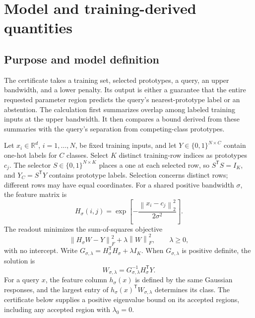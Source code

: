 \documentclass[preprint,12pt]{elsarticle}
\newcommand{\R}{\mathbb{R}}
\newcommand{\norm}[1]{\left\lVert#1\right\rVert}
\newcommand{\tr}{\mathsf{T}}
\begin{document}
\section{Model and training-derived quantities}
\subsection{Purpose and model definition}
The certificate takes a training set, selected prototypes, a query, an upper bandwidth, and a lower penalty. Its output is either a guarantee that the entire requested parameter region predicts the query's nearest-prototype label or an abstention. The calculation first summarizes overlap among labeled training inputs at the upper bandwidth. It then compares a bound derived from these summaries with the query's separation from competing-class prototypes.

Let $x_i\in\R^d$, $i=1,\ldots,N$, be fixed training inputs, and let $Y\in\{0,1\}^{N\times C}$ contain one-hot labels for $C$ classes. Select $K$ distinct training-row indices as prototypes $c_j$. The selector $S\in\{0,1\}^{N\times K}$ places a one at each selected row, so $S^\tr S=I_K$, and $Y_C=S^\tr Y$ contains prototype labels. Selection concerns distinct rows; different rows may have equal coordinates. For a shared positive bandwidth $\sigma$, the feature matrix is
\begin{equation}
 H_\sigma(i,j)=\exp\left[-\frac{\norm{x_i-c_j}_2^2}{2\sigma^2}\right].
 \label{eq:features}
\end{equation}
The readout minimizes the sum-of-squares objective
\begin{equation}
 \norm{H_\sigma W-Y}_F^2+\lambda\norm{W}_F^2,\qquad \lambda\geq0,
 \label{eq:objective}
\end{equation}
with no intercept. Write $G_{\sigma,\lambda}=H_\sigma^\tr H_\sigma+\lambda I_K$. When $G_{\sigma,\lambda}$ is positive definite, the solution is
\begin{equation}
 W_{\sigma,\lambda}=G_{\sigma,\lambda}^{-1}H_\sigma^\tr Y.
 \label{eq:readout}
\end{equation}
For a query $x$, the feature column $h_\sigma(x)$ is defined by the same Gaussian responses, and the largest entry of $h_\sigma(x)^\tr W_{\sigma,\lambda}$ determines its class. The certificate below supplies a positive eigenvalue bound on its accepted regions, including any accepted region with $\lambda_0=0$.
\end{document}
